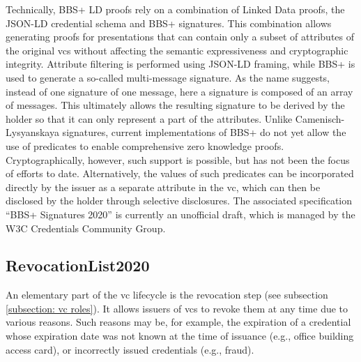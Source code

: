 		Technically, BBS+ LD proofs rely on a combination of Linked Data proofs, the JSON-LD credential schema and BBS+ signatures. This combination allows generating proofs for presentations that can contain only a subset of attributes of the original \acp{vc} without affecting the semantic expressiveness and cryptographic integrity. Attribute filtering is performed using JSON-LD framing, while BBS+ is used to generate a so-called multi-message signature. As the name suggests, instead of one signature of one message, here a signature is composed of an array of messages. This ultimately allows the resulting signature to be derived by the holder so that it can only represent a part of the attributes. Unlike Camenisch-Lysyanskaya signatures, current implementations of BBS+ do not yet allow the use of predicates to enable comprehensive zero knowledge proofs. Cryptographically, however, such support is possible, but has not been the focus of efforts to date. Alternatively, the values of such predicates can be incorporated directly by the issuer as a separate attribute in the \ac{vc}, which can then be disclosed by the holder through selective disclosures. The associated specification “BBS+ Signatures 2020” \cite{looker_bbs_2021} is currently an unofficial draft, which is managed by the W3C Credentials Community Group. \cite[pp. 18-20]{young_verifiable_2021}
		
		\subsection{RevocationList2020}\label{subsection: revocationlist2020}
		
		An elementary part of the \ac{vc} lifecycle is the revocation step (see subsection \ref{subsection: vc roles}). It allows issuers of \acp{vc} to revoke them at any time due to various reasons. Such reasons may be, for example, the expiration of a credential whose expiration date was not known at the time of issuance (e.g., office building access card), or incorrectly issued credentials (e.g., fraud).
		
